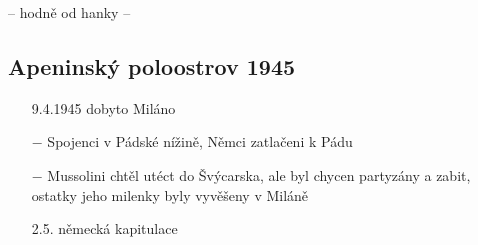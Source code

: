 \documentclass{article}
\begin{document}
-- hodně od hanky --

\subsection*{Apeninský poloostrov 1945}
\begin{itemize}
    \vspace{-0.5em}
    \setlength\itemsep{0.15em}
    \item[9.4.1945] dobyto Miláno
    \item[$-$] Spojenci v Pádské nížině, Němci zatlačeni k Pádu
    \item[$-$] Mussolini chtěl utéct do Švýcarska, ale byl chycen partyzány a zabit, ostatky jeho milenky byly vyvěšeny v Miláně
    \item[2.5.] německá kapitulace
\end{itemize}
\end{document}
